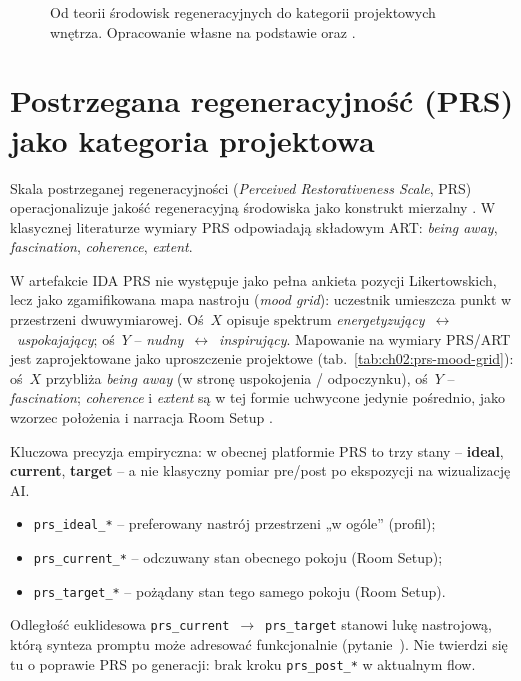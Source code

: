 \begin{figure}[htbp]
  \centering
  \caption{Od teorii środowisk regeneracyjnych do kategorii projektowych wnętrza.
    Opracowanie własne na podstawie \textcite{kaplan1995restorative} oraz \textcite{ulrich1984window}.}
  \label{fig:ch02:restorative-framework}
\end{figure}

\section{Postrzegana regeneracyjność (PRS) jako kategoria projektowa}
\label{ch02:sec:prs}

Skala postrzeganej regeneracyjności (\emph{Perceived Restorativeness Scale}, PRS) operacjonalizuje jakość regeneracyjną środowiska jako konstrukt mierzalny \parencite{hartig1997prs}.
W klasycznej literaturze wymiary PRS odpowiadają składowym ART: \emph{being away}, \emph{fascination}, \emph{coherence}, \emph{extent}.

W artefakcie IDA PRS nie występuje jako pełna ankieta pozycji Likertowskich, lecz jako zgamifikowana mapa nastroju (\emph{mood grid}): uczestnik umieszcza punkt w przestrzeni dwuwymiarowej.
Oś~$X$ opisuje spektrum \emph{energetyzujący}~$\leftrightarrow$~\emph{uspokajający}; oś~$Y$ -- \emph{nudny}~$\leftrightarrow$~\emph{inspirujący}.
Mapowanie na wymiary PRS/ART jest zaprojektowane jako uproszczenie projektowe (tab.~\ref{tab:ch02:prs-mood-grid}): oś~$X$ przybliża \emph{being away} (w stronę uspokojenia / odpoczynku), oś~$Y$ -- \emph{fascination}; \emph{coherence} i \emph{extent} są w tej formie uchwycone jedynie pośrednio, jako wzorzec położenia i narracja Room Setup \parencite{idaPlatform2026}.

Kluczowa precyzja empiryczna: w obecnej platformie PRS to trzy stany -- \textbf{ideal}, \textbf{current}, \textbf{target} -- a nie klasyczny pomiar pre/post po ekspozycji na wizualizację AI.
\begin{itemize}
  \item \texttt{prs\_ideal\_*} -- preferowany nastrój przestrzeni „w ogóle” (profil);
  \item \texttt{prs\_current\_*} -- odczuwany stan obecnego pokoju (Room Setup);
  \item \texttt{prs\_target\_*} -- pożądany stan tego samego pokoju (Room Setup).
\end{itemize}
Odległość euklidesowa \texttt{prs\_current}~$\rightarrow$~\texttt{prs\_target} stanowi lukę nastrojową, którą synteza promptu może adresować funkcjonalnie (pytanie~).
Nie twierdzi się tu o poprawie PRS po generacji: brak kroku \texttt{prs\_post\_*} w aktualnym flow.

